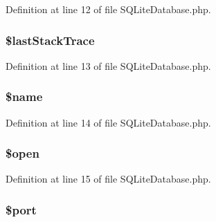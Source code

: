Definition at line 12 of file S\+Q\+Lite\+Database.\+php.

\hypertarget{class_s_q_lite_database_a12ff8f78a47e0fa691355a485c2e696a}{}
\subsubsection[{\$last\+Stack\+Trace}]{\setlength{\rightskip}{0pt plus 5cm}\$last\+Stack\+Trace\hspace{0.3cm}{\ttfamily [protected]}}\label{class_s_q_lite_database_a12ff8f78a47e0fa691355a485c2e696a}


Definition at line 13 of file S\+Q\+Lite\+Database.\+php.

\hypertarget{class_s_q_lite_database_ab2fc40d43824ea3e1ce5d86dee0d763b}{}
\subsubsection[{\$name}]{\setlength{\rightskip}{0pt plus 5cm}\$name\hspace{0.3cm}{\ttfamily [protected]}}\label{class_s_q_lite_database_ab2fc40d43824ea3e1ce5d86dee0d763b}


Definition at line 14 of file S\+Q\+Lite\+Database.\+php.

\hypertarget{class_s_q_lite_database_a4269f690c0554ecb1deec21b80f321dc}{}
\subsubsection[{\$open}]{\setlength{\rightskip}{0pt plus 5cm}\$open\hspace{0.3cm}{\ttfamily [protected]}}\label{class_s_q_lite_database_a4269f690c0554ecb1deec21b80f321dc}


Definition at line 15 of file S\+Q\+Lite\+Database.\+php.

\hypertarget{class_s_q_lite_database_aa0787efab4b22e8a212882f3409d4c77}{}
\subsubsection[{\$port}]{\setlength{\rightskip}{0pt plus 5cm}\$port\hspace{0.3cm}{\ttfamily [protected]}}\label{class_s_q_lite_database_aa0787efab4b22e8a212882f3409d4c77}


